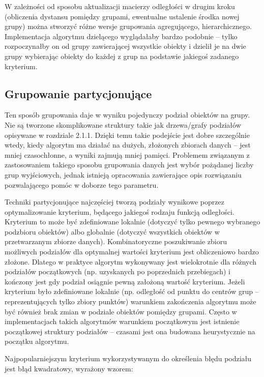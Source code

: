 \documentclass{article}
\begin{document}
W zależności od sposobu aktualizacji macierzy odległości w drugim kroku (obliczenia dystansu pomiędzy grupami, ewentualne ustalenie środka nowej grupy) można stworzyć różne wersje grupowania agregującego, hierarchicznego. Implementacja algorytmu dzielącego wyglądałaby bardzo podobnie – tylko rozpoczynałby on od grupy zawierającej wszystkie obiekty i dzielił je na dwie grupy wybierając obiekty do każdej z grup na podstawie jakiegoś zadanego kryterium. 

\subsection{Grupowanie partycjonujące}
Ten sposób grupowania daje w wyniku pojedynczy podział obiektów na grupy. Nie są tworzone skomplikowane struktury takie jak drzewa/grafy podziałów opisywane w rozdziale 2.1.1. Dzięki temu takie podejście jest dobre szczególnie wtedy, kiedy algorytm ma działać na dużych, złożonych zbiorach danych – jest mniej czasochłonne, a wyniki zajmują mniej pamięci. Problemem związanym z zastosowaniem takiego sposobu grupowania danych jest wybór pożądanej liczby grup wyjściowych, jednak istnieją opracowania zawierające opis rozwiązaniu pozwalającego pomóc w doborze tego parametru. 
 
Techniki partycjonujące najczęściej tworzą podziały wynikowe poprzez optymalizowanie kryterium, będącego jakiegoś rodzaju funkcją odległości. Kryterium to może być zdefiniowane lokalnie (dotyczyć tylko pewnego wybranego podzbioru obiektów) albo globalnie (dotyczyć wszystkich obiektów w przetwarzanym zbiorze danych). Kombinatoryczne poszukiwanie zbioru możliwych podziałów dla optymalnej wartości kryterium jest obliczeniowo bardzo złożone. Dlatego w praktyce algorytm wykonywany jest wielokrotnie dla różnych podziałów początkowych (np. uzyskanych po poprzednich przebiegach) i kończony jest gdy podział osiągnie pewną założoną wartość kryterium. Jeżeli kryterium było zdefiniowane lokalnie (np. odległość od punktu do centrów grup – reprezentujących tylko zbiory punktów) warunkiem zakończenia algorytmu może  być również brak zmian w podziale obiektów pomiędzy grupami. Często w implementacjach takich algorytmów warunkiem początkowym jest istnienie początkowej struktury podziałów – czasami jest ona budowana heurystycznie na początku algorytmu. 

Najpopularniejszym kryterium wykorzystywanym do określenia błędu podziału jest błąd kwadratowy, wyrażony wzorem:
\end{document}
